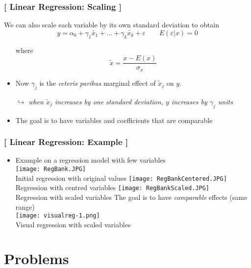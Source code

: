 \documentclass[xcolor=x11names,compress]{beamer}
\renewcommand{\(}{\begin{columns}}
\renewcommand{\)}{\end{columns}}
\newcommand{\<}[1]{\begin{column}{#1}}
\renewcommand{\>}{\end{column}}
\begin{document}
\begin{frame} %
\frametitle{\textcolor{brique}{[ Linear Regression: Scaling ]}}

We can also scale each variable by its own standard deviation to obtain
$$
y = \alpha_0 + \gamma_1 \tilde{x_1} + \ldots + \gamma_{k} \tilde{x_k}  + \varepsilon \qquad E (\varepsilon|x)  = 0
$$
\pause
\begin{itemize}[<+->]
  \item[] where $$\tilde{x} = \frac{x-E(x)}{\sigma_x} $$
  \item Now $\gamma_j$ is the \textit{ceteris paribus} marginal effect of $\tilde{x}_j$ on $y$.
   \item[$\hookrightarrow$] \textit{when  $\tilde{x}_j$ increases by one standard deviation,  $y$ increases by $\gamma_j$ units}
  \item The goal is to have variables and coefficients that are comparable
\end{itemize}
\end{frame}


\begin{frame} %
\frametitle{\textcolor{brique}{[ Linear Regression: Example ]}}
\pause
\begin{itemize}
\item Example on a regression model with few variables\\
   {\texttt{[image: RegBank.JPG]} \\ }
   {Initial regression with original values}
   { \texttt{[image: RegBankCentered.JPG]} \\ }
   {Regression with centred variables}
   {\texttt{[image: RegBankScaled.JPG]} \\ }
   {Regression with scaled variables}
   {The goal is to have \textit{comparable} effects (same range)\\ }
   {\texttt{[image: visualreg-1.png]} \\ }
   {Visual regression with scaled variables}
\end{itemize}
\end{frame}


\section{Problems}
\end{document}
